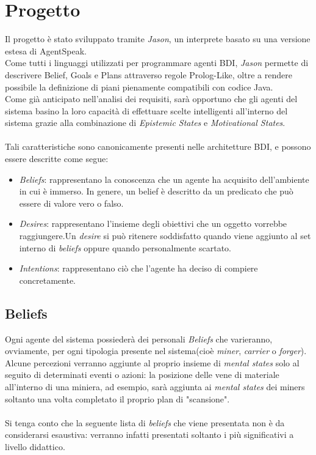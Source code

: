 \documentclass{llncs}
\newcommand{\labelsec}[1]{\label{sec:#1}}
\begin{document}
\section{Progetto}
\labelsec{Progetto}
Il progetto è stato sviluppato tramite \textit{Jason}, un interprete basato su una versione estesa di AgentSpeak.\\
Come tutti i linguaggi utilizzati per programmare agenti BDI, \textit{Jason} permette di descrivere Belief, Goals e Plans attraverso regole Prolog-Like, oltre a rendere possibile la definizione di piani pienamente compatibili con codice Java.\\
Come già anticipato nell'analisi dei requisiti, sarà opportuno che gli agenti del sistema basino la loro capacità di effettuare scelte intelligenti all'interno del sistema grazie alla combinazione di \textit{Epistemic States} e \textit{Motivational States}.\\\\
Tali caratteristiche sono canonicamente presenti nelle architetture BDI, e possono essere descritte come segue:
\begin{itemize}
	\item \textit{Beliefs}: rappresentano la conoscenza che un agente ha acquisito dell'ambiente in cui è immerso. In genere, un belief è descritto da un predicato che può essere di valore vero o falso.\\
	\item \textit{Desires}: rappresentano l'insieme degli obiettivi che un oggetto vorrebbe raggiungere.Un \textit{desire} si può ritenere soddisfatto quando viene aggiunto al set interno di \textit{beliefs} oppure quando personalmente scartato.\\
	\item \textit{Intentions}: rappresentano ciò che l'agente ha deciso di compiere concretamente.
\end{itemize}
\newpage
\subsection{Beliefs}
Ogni agente del sistema possiederà dei personali \textit{Beliefs} che varieranno, ovviamente, per ogni tipologia presente nel sistema(cioè \textit{miner}, \textit{carrier} o \textit{forger}).\\Alcune percezioni verranno aggiunte al proprio insieme di \textit{mental states} solo al seguito di determinati eventi o azioni: la posizione delle vene di materiale all'interno di una miniera, ad esempio, sarà aggiunta ai \textit{mental states} dei miners soltanto una volta completato il proprio plan di "scansione".\\\\
Si tenga conto che la seguente lista di \textit{beliefs} che viene presentata non è da considerarsi esaustiva: verranno infatti presentati soltanto i più significativi a livello didattico.
\end{document}
